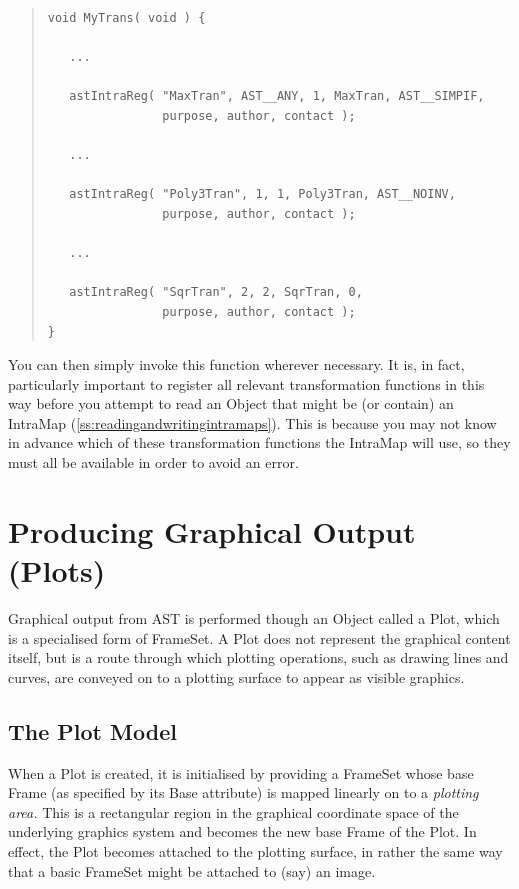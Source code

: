 \documentclass[twoside,11pt]{article}
\newcommand{\htmlref}[2]{#1}
\newcommand{\secref}[1]{\S\ref{#1}}
\renewcommand{\secref}[1]{\ref{#1}}
\begin{document}
\begin{quote}
\small
\begin{verbatim}
void MyTrans( void ) {

   ...

   astIntraReg( "MaxTran", AST__ANY, 1, MaxTran, AST__SIMPIF,
                purpose, author, contact );

   ...

   astIntraReg( "Poly3Tran", 1, 1, Poly3Tran, AST__NOINV,
                purpose, author, contact );

   ...

   astIntraReg( "SqrTran", 2, 2, SqrTran, 0,
                purpose, author, contact );
}
\end{verbatim}
\normalsize
\end{quote}

You can then simply invoke this function wherever necessary. It is, in
fact, particularly important to register all relevant transformation
functions in this way before you attempt to read an \htmlref{Object}{Object} that might
be (or contain) an \htmlref{IntraMap}{IntraMap}
(\secref{ss:readingandwritingintramaps}). This is because you may not
know in advance which of these transformation functions the IntraMap
will use, so they must all be available in order to avoid an error.

\cleardoublepage
%
\section{\label{ss:plots}Producing Graphical Output (Plots)}

Graphical output from AST is performed though an \htmlref{Object}{Object} called a \htmlref{Plot}{Plot},
which is a specialised form of \htmlref{FrameSet}{FrameSet}. A Plot does not represent the
graphical content itself, but is a route through which plotting
operations, such as drawing lines and curves, are conveyed on to a
plotting surface to appear as visible graphics.

\subsection{The Plot Model}

When a \htmlref{Plot}{Plot} is created, it is initialised by providing a \htmlref{FrameSet}{FrameSet}
whose base \htmlref{Frame}{Frame} (as specified by its \htmlref{Base}{Base} attribute) is mapped
linearly on to a {\em{plotting area.}} This is a rectangular region in
the graphical coordinate space of the underlying graphics system and
becomes the new base Frame of the Plot. In effect, the Plot becomes
attached to the plotting surface, in rather the same way that a basic
FrameSet might be attached to (say) an image.
\end{document}

